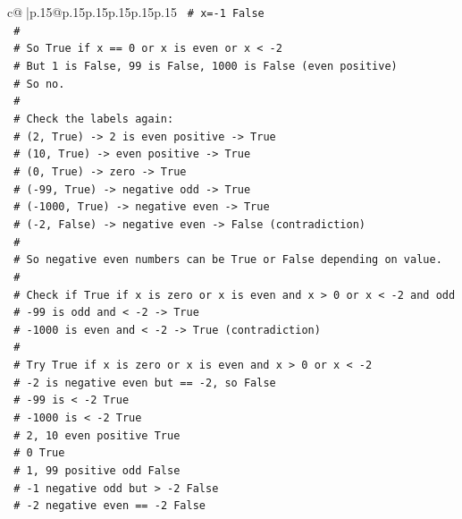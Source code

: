 \documentclass{article}
\begin{document}
{\begin{supertabular}{c@{$\;$}|p{.15\linewidth}@{}p{.15\linewidth}p{.15\linewidth}p{.15\linewidth}p{.15\linewidth}p{.15\linewidth}}
{{{\texttt{    \# x={-}1 False} \\
\texttt{    \#} \\
\texttt{    \# So True if x == 0 or x is even or x < {-}2} \\
\texttt{    \# But 1 is False, 99 is False, 1000 is False (even positive)} \\
\texttt{    \# So no.} \\
\texttt{    \#} \\
\texttt{    \# Check the labels again:} \\
\texttt{    \# (2, True) {-}> 2 is even positive {-}> True} \\
\texttt{    \# (10, True) {-}> even positive {-}> True} \\
\texttt{    \# (0, True) {-}> zero {-}> True} \\
\texttt{    \# ({-}99, True) {-}> negative odd {-}> True} \\
\texttt{    \# ({-}1000, True) {-}> negative even {-}> True} \\
\texttt{    \# ({-}2, False) {-}> negative even {-}> False (contradiction)} \\
\texttt{    \#} \\
\texttt{    \# So negative even numbers can be True or False depending on value.} \\
\texttt{    \#} \\
\texttt{    \# Check if True if x is zero or x is even and x > 0 or x < {-}2 and odd} \\
\texttt{    \# {-}99 is odd and < {-}2 {-}> True} \\
\texttt{    \# {-}1000 is even and < {-}2 {-}> True (contradiction)} \\
\texttt{    \#} \\
\texttt{    \# Try True if x is zero or x is even and x > 0 or x < {-}2} \\
\texttt{    \# {-}2 is negative even but == {-}2, so False} \\
\texttt{    \# {-}99 is < {-}2 True} \\
\texttt{    \# {-}1000 is < {-}2 True} \\
\texttt{    \# 2, 10 even positive True} \\
\texttt{    \# 0 True} \\
\texttt{    \# 1, 99 positive odd False} \\
\texttt{    \# {-}1 negative odd but > {-}2 False} \\
\texttt{    \# {-}2 negative even == {-}2 False} \\
}}}
\end{supertabular}}
\end{document}
